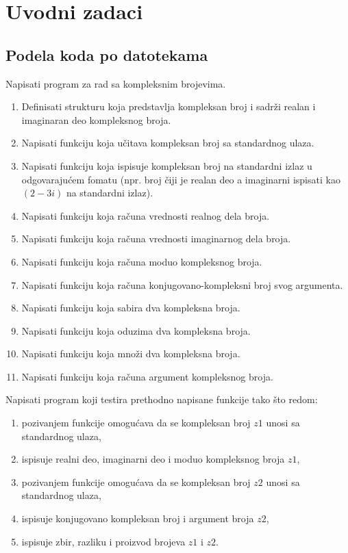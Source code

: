 \chapter{Uvodni zadaci}

\section{Podela koda po datotekama}

\begin{Exercise}[label=001] %
Napisati program za rad sa kompleksnim brojevima.
\begin{enumerate}
\item Definisati strukturu  koja predstavlja kompleksan broj i sadrži realan i imaginaran deo kompleksnog broja.
\item Napisati funkciju  koja učitava kompleksan broj sa standardnog ulaza.
\item Napisati funkciju  koja ispisuje kompleksan broj na standardni izlaz u odgovarajućem fomatu (npr. broj čiji je realan deo  a imaginarni  ispisati kao $(2 - 3 i)$ na standardni izlaz).
\item Napisati funkciju  koja računa vrednosti realnog dela broja.
\item Napisati funkciju  koja računa vrednosti imaginarnog dela broja.
\item Napisati funkciju  koja računa moduo kompleksnog broja.
\item Napisati funkciju  koja računa konjugovano-kompleksni broj svog argumenta.
\item Napisati funkciju  koja sabira dva kompleksna broja.
\item Napisati funkciju  koja oduzima dva kompleksna broja.
\item Napisati funkciju  koja množi dva kompleksna broja.
\item Napisati funkciju  koja računa argument kompleksnog broja.
\end{enumerate}
Napisati program koji testira prethodno napisane funkcije tako što redom:
\begin{enumerate}
\item pozivanjem funkcije  omogućava da se kompleksan broj $z1$  unosi sa standardnog ulaza,
\item ispisuje realni deo, imaginarni deo i moduo kompleksnog broja $z1$,
\item pozivanjem funkcije  omogućava da se kompleksan broj $z2$  unosi sa standardnog ulaza,
\item ispisuje konjugovano kompleksan broj i argument broja $z2$,
\item ispisuje zbir, razliku i proizvod brojeva $z1$ i $z2$.
\end{enumerate}


\end{Exercise}
